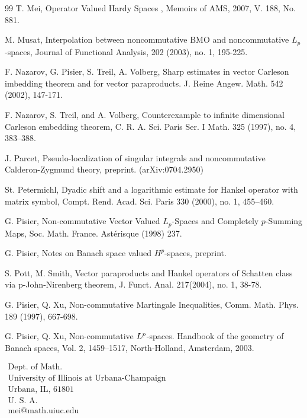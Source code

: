\begin{thebibliography}{99}
  T. Mei, Operator Valued Hardy Spaces , Memoirs of AMS,
2007, V. 188, No. 881.

  M. Musat, Interpolation between noncommutative {\rm BMO} and
noncommutative $L_p$-spaces, Journal of Functional Analysis, 202 (2003), no.
1, 195-225.

  F. Nazarov, G. Pisier, S. Treil, A. Volberg, Sharp estimates
in vector Carleson imbedding theorem and for vector paraproducts. J. Reine
Angew. Math. 542 (2002), 147-171.

  F. Nazarov, S. Treil, and A. Volberg, Counterexample to
infinite dimensional Carleson embedding theorem, C. R. A. Sci. Paris Ser. I
Math. 325 (1997), no. 4, 383--388.

  J. Parcet, Pseudo-localization of singular integrals and noncommutative
Calderon-Zygmund theory, preprint. (arXiv:0704.2950)

  St. Petermichl, Dyadic shift and a logarithmic estimate for
Hankel operator with matrix symbol, Compt. Rend. Acad. Sci. Paris 330
(2000), no. 1, 455--460.

 G. Pisier, Non-commutative Vector Valued $L_p$-Spaces and
Completely $p$-Summing Maps, Soc. Math. France. Ast\'{e}risque
(1998) 237.

  G. Pisier, Notes on Banach space valued $H^p$-spaces,
preprint.

  S. Pott, M. Smith, Vector paraproducts and Hankel operators of
Schatten class via p-John-Nirenberg theorem, J. Funct. Anal. 217(2004), no.
1, 38-78.

  G. Pisier, Q. Xu, Non-commutative Martingale Inequalities,
Comm. Math. Phys. 189 (1997), 667-698.

  G. Pisier, Q. Xu, Non-commutative $L\sp p$-spaces. Handbook of the geometry of Banach
spaces, Vol. 2, 1459--1517, North-Holland, Amsterdam, 2003.

\end{thebibliography}

\medskip
$
\begin{array}{l}
\mbox{Dept. of Math.} \\
\mbox{University of Illinois at Urbana-Champaign} \\
\mbox{Urbana, IL, 61801} \\
\mbox{U. S. A.} \\
\mbox{mei@math.uiuc.edu}
\end{array}
$


